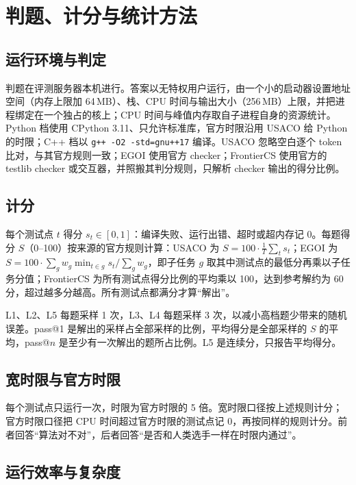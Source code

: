 \documentclass[11pt,a4paper,fontset=none]{ctexart}
\begin{document}
\section{判题、计分与统计方法}
\label{sec:method}

\subsection{运行环境与判定}

判题在评测服务器本机进行。答案以无特权用户运行，由一个小的启动器设置地址空间（内存上限加 64\,MB）、栈、CPU 时间与输出大小（256\,MB）上限，并把进程绑定在一个独占的核上；CPU 时间与峰值内存取自子进程自身的资源统计。Python 档使用 CPython 3.11、只允许标准库，官方时限沿用 USACO 给 Python 的时限；C++ 档以 \texttt{g++ -O2 -std=gnu++17} 编译。USACO 忽略空白逐个 token 比对，与其官方规则一致；EGOI 使用官方 checker；FrontierCS 使用官方的 testlib checker 或交互器，并照搬其判分规则，只解析 checker 输出的得分比例。

\subsection{计分}

每个测试点 $t$ 得分 $s_t \in [0, 1]$：编译失败、运行出错、超时或超内存记 0。每题得分 $S$（0--100）按来源的官方规则计算：USACO 为 $S = 100 \cdot \frac{1}{T}\sum_t s_t$；EGOI 为 $S = 100 \cdot \sum_g w_g \min_{t \in g} s_t / \sum_g w_g$，即子任务 $g$ 取其中测试点的最低分再乘以子任务分值；FrontierCS 为所有测试点得分比例的平均乘以 100，达到参考解约为 60 分，超过越多分越高。所有测试点都满分才算“解出”。

L1、L2、L5 每题采样 1 次，L3、L4 每题采样 3 次，以减小高档题少带来的随机误差。pass@1 是解出的采样占全部采样的比例，平均得分是全部采样的 $S$ 的平均，pass@$n$ 是至少有一次解出的题所占比例。L5 是连续分，只报告平均得分。

\subsection{宽时限与官方时限}

每个测试点只运行一次，时限为官方时限的 5 倍。宽时限口径按上述规则计分；官方时限口径把 CPU 时间超过官方时限的测试点记 0，再按同样的规则计分。前者回答“算法对不对”，后者回答“是否和人类选手一样在时限内通过”。

\subsection{运行效率与复杂度}
\end{document}
